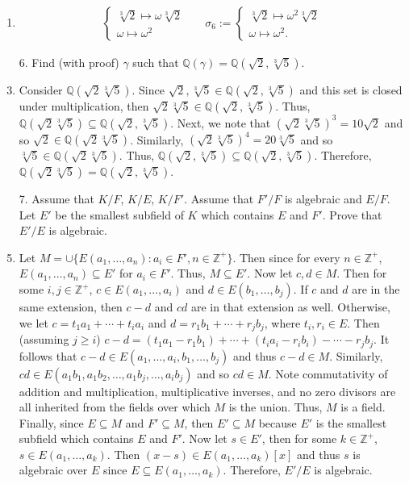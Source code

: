 \documentclass[12pt]{article}
\makeatletter
\theoremstyle{definition}
\theoremstyle{remark}
\renewenvironment{proof}[1][\proofname]{\par
  \pushQED{\qed}%
  \normalfont \topsep6\p@\@plus6\p@\relax
  \list{}{\leftmargin=0mm
          \rightmargin=4mm
          \settowidth{\itemindent}{\itshape#1}%
          \labelwidth=\itemindent
          \parsep=0pt \listparindent=\parindent 
  }
  \item[\hskip\labelsep
        \itshape
    #1\@addpunct{.}]\ignorespaces
}{%
  \popQED\endlist\@endpefalse
}
\newenvironment{solution}[1][\bf{\textit{Solution}}]{\par
  
  \normalfont \topsep6\p@\@plus6\p@\relax
  \list{}{\leftmargin=0mm
          \rightmargin=4mm
          \settowidth{\itemindent}{\itshape#1}%
          \labelwidth=\itemindent
          \parsep=0pt \listparindent=\parindent 
  }
  \item[\hskip\labelsep
        \itshape
    #1\@addpunct{.}]\ignorespaces
}{%
  \popQED\endlist\@endpefalse
}
\let\oldproofname=\proofname
\renewcommand{\proofname}{\bf{\textit{\oldproofname}}}
\makeatother
\begin{document}
\begin{enumerate}[leftmargin=*]
\begin{solution}
\begin{align*}
\begin{cases}
                            \sqrt[3]{2}\mapsto\omega\sqrt[3]{2}\\
                            \omega\mapsto\omega^2
                        \end{cases} && \sigma_6 :=\begin{cases} 
                            \sqrt[3]{2}\mapsto\omega^2\sqrt[3]{2}\\
                            \omega\mapsto\omega^2.
                        \end{cases}
                    \end{align*}
            \end{solution}
        \item[6.] Find (with proof) $\gamma$ such that $\mathbb{Q}(\gamma)=\mathbb{Q}(\sqrt{2},\sqrt[3]{5})$.
            \begin{proof}
                Consider $\mathbb{Q}(\sqrt{2}\sqrt[3]{5})$. Since $\sqrt{2},\sqrt[3]{5}\in\mathbb{Q}(\sqrt{2},\sqrt[3]{5})$ and this set is closed under multiplication, then $\sqrt{2}\sqrt[3]{5}\in\mathbb{Q}(\sqrt{2},\sqrt[3]{5})$. Thus, $\mathbb{Q}(\sqrt{2}\sqrt[3]{5})\subseteq\mathbb{Q}(\sqrt{2},\sqrt[3]{5})$. Next, we note that $(\sqrt{2}\sqrt[3]{5})^3=10\sqrt{2}$ and so $\sqrt{2}\in\mathbb{Q}(\sqrt{2}\sqrt[3]{5})$. Similarly, $(\sqrt{2}\sqrt[3]{5})^4=20\sqrt[3]{5}$ and so $\sqrt[3]{5}\in\mathbb{Q}(\sqrt{2}\sqrt[3]{5})$. Thus, $\mathbb{Q}(\sqrt{2},\sqrt[3]{5})\subseteq\mathbb{Q}(\sqrt{2},\sqrt[3]{5})$. Therefore, $\mathbb{Q}(\sqrt{2}\sqrt[3]{5})=\mathbb{Q}(\sqrt{2},\sqrt[3]{5})$.
            \end{proof}\newpage
        \item[7.] Assume that $K/F$, $K/E$, $K/F'$. Assume that $F'/F$ is algebraic and $E/F$. Let $E'$ be the smallest subfield of $K$ which contains $E$ and $F'$. Prove that $E'/E$ is algebraic. 
            \begin{proof}
                Let $M=\cup\{E(a_1,\dots,a_n)\colon a_i\in F', n\in\mathbb{Z}^+\}$. Then since for every $n\in\mathbb{Z}^+$, $E(a_1,\dots,a_n)\subseteq E'$ for $a_i\in F'$. Thus, $M\subseteq E'$. Now let $c,d\in M$. Then for some $i,j\in\mathbb{Z}^+$, $c\in E(a_1,\dots,a_i)$ and $d\in E(b_1,\dots,b_j)$. If $c$ and $d$ are in the same extension, then $c-d$ and $cd$ are in that extension as well. Otherwise, we let $c=t_1a_1+\cdots+t_ia_i$ and $d=r_1b_1+\cdots +r_jb_j$, where $t_i,r_i\in E$. Then (assuming $j\geq i$) $c-d=(t_1a_1-r_1b_1)+\cdots+(t_ia_i-r_ib_i)-\cdots-r_jb_j$. It follows that $c-d\in E(a_1,\dots,a_i,b_1,\dots,b_j)$ and thus $c-d\in M$. Similarly, $cd\in E(a_1b_1,a_1b_2,\dots, a_1b_j,\dots,a_ib_j)$ and so $cd\in M$. Note commutativity of addition and multiplication, multiplicative inverses, and no zero divisors are all inherited from the fields over which $M$ is the union. Thus, $M$ is a field. Finally, since $E\subseteq M$ and $F'\subseteq M$, then $E'\subseteq M$ because $E'$ is the smallest subfield which contains $E$ and $F'$. Now let $s\in E'$, then for some $k\in\mathbb{Z}^+$, $s\in E(a_1,\dots,a_k)$. Then $(x-s)\in E(a_1,\dots,a_k)[x]$ and thus $s$ is algebraic over $E$ since $E\subseteq E(a_1,\dots,a_k)$. Therefore, $E'/E$ is algebraic.

\end{proof}
\end{enumerate}
\end{document}
